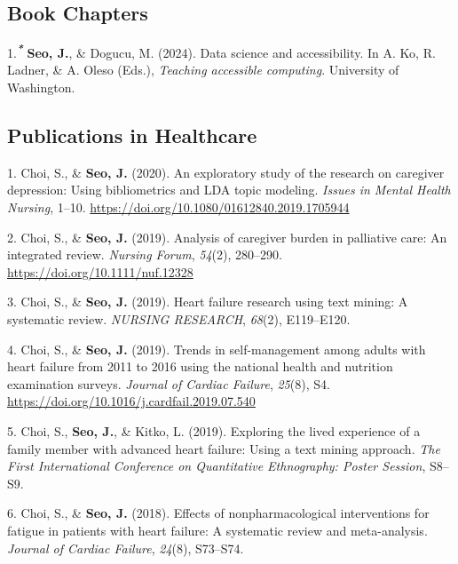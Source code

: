 \documentclass[11pt,a4paper,]{awesome-cv}
\newlength{\cslhangindent}
\newenvironment{CSLReferences}[2] %
 {\begin{list}{}{%
  \setlength{\itemindent}{0pt}
  \setlength{\leftmargin}{0pt}
  \setlength{\parsep}{0pt}
  \ifodd #1
   \setlength{\leftmargin}{\cslhangindent}
   \setlength{\itemindent}{-1\cslhangindent}
  \fi
  \setlength{\itemsep}{#2\baselineskip}}}
 {\end{list}}
\begin{document}
\subsection{Book Chapters}\label{book-chapters-1}

\label{refs-06a43cf8d0163263410720e1e6ecf8e3}
\begin{CSLReferences}{1}{0}
1.\textsuperscript{\textbf{\emph{*}}} \textbf{Seo, J.}, \& Dogucu, M.
(2024). Data science and accessibility. In A. Ko, R. Ladner, \& A. Oleso
(Eds.), \emph{Teaching accessible computing}. University of Washington.

\end{CSLReferences}

\subsection{Publications in
Healthcare}\label{publications-in-healthcare-1}

\label{refs-d735fc8e424a60effc95b6b86f680502}
\begin{CSLReferences}{1}{0}
1. Choi, S., \& \textbf{Seo, J.} (2020). An exploratory study of the
research on caregiver depression: Using bibliometrics and LDA topic
modeling. \emph{Issues in Mental Health Nursing}, 1--10.
\url{https://doi.org/10.1080/01612840.2019.1705944}

2. Choi, S., \& \textbf{Seo, J.} (2019). Analysis of caregiver burden in
palliative care: An integrated review. \emph{Nursing Forum},
\emph{54}(2), 280--290. \url{https://doi.org/10.1111/nuf.12328}

3. Choi, S., \& \textbf{Seo, J.} (2019). Heart failure research using
text mining: A systematic review. \emph{NURSING RESEARCH}, \emph{68}(2),
E119--E120.

4. Choi, S., \& \textbf{Seo, J.} (2019). Trends in self-management among
adults with heart failure from 2011 to 2016 using the national health
and nutrition examination surveys. \emph{Journal of Cardiac Failure},
\emph{25}(8), S4. \url{https://doi.org/10.1016/j.cardfail.2019.07.540}

5. Choi, S., \textbf{Seo, J.}, \& Kitko, L. (2019). Exploring the lived
experience of a family member with advanced heart failure: Using a text
mining approach. \emph{The First International Conference on
Quantitative Ethnography: Poster Session}, S8--S9.

6. Choi, S., \& \textbf{Seo, J.} (2018). Effects of nonpharmacological
interventions for fatigue in patients with heart failure: A systematic
review and meta-analysis. \emph{Journal of Cardiac Failure},
\emph{24}(8), S73--S74.

\end{CSLReferences}
\end{document}
